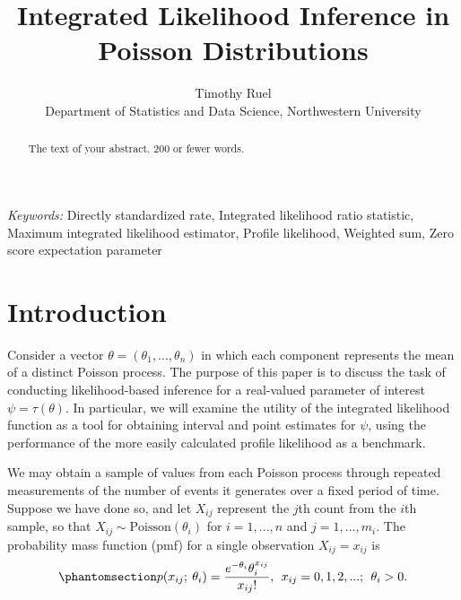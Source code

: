 \documentclass[
  12pt]{article}
\begin{document}
\def\spacingset#1{\renewcommand{\baselinestretch}%
{#1}\small\normalsize} \spacingset{1}



\title{\bf Integrated Likelihood Inference in Poisson Distributions}
\author{
Timothy Ruel\\
Department of Statistics and Data Science, Northwestern University\\
}
\maketitle

\bigskip
\bigskip
\begin{abstract}
The text of your abstract. 200 or fewer words.
\end{abstract}

\noindent%
{\it Keywords:} Directly standardized rate, Integrated likelihood ratio
statistic, Maximum integrated likelihood estimator, Profile
likelihood, Weighted sum, Zero score expectation parameter
\vfill

\newpage
\spacingset{1.9} %

\section{Introduction}\label{sec-intro}

Consider a vector \(\theta = (\theta_1, ..., \theta_n)\) in which each
component represents the mean of a distinct Poisson process. The purpose
of this paper is to discuss the task of conducting likelihood-based
inference for a real-valued parameter of interest
\(\psi = \tau(\theta)\). In particular, we will examine the utility of
the integrated likelihood function as a tool for obtaining interval and
point estimates for \(\psi\), using the performance of the more easily
calculated profile likelihood as a benchmark.

We may obtain a sample of values from each Poisson process through
repeated measurements of the number of events it generates over a fixed
period of time. Suppose we have done so, and let \(X_{ij}\) represent
the \(j\)th count from the \(i\)th sample, so that
\(X_{ij} \sim \text{Poisson}(\theta_i)\) for \(i = 1, ..., n\) and
\(j = 1, ..., m_i.\) The probability mass function (pmf) for a single
observation \(X_{ij} = x_{ij}\) is
\begin{equation}\phantomsection\label{eq-1-1}{
p(x_{ij}; \> \theta_i) = \frac{e^{-\theta_i} \theta_i ^ {x_{ij}}}{x_{ij}!}, \> \> x_{ij} = 0, 1, 2, ... ; \> \> \theta_i > 0.
}\end{equation}
\end{document}
